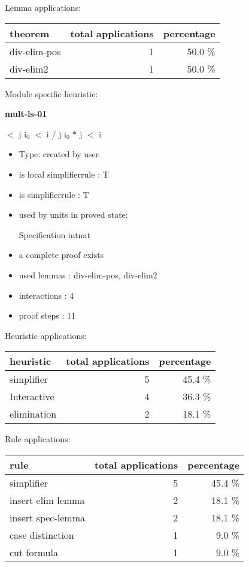 \documentclass[a4paper]{article}
\begin{document}
Lemma applications:

\begin{supertabular}{l|r|r}
theorem	        & total applications & percentage \\ \hline
div-elim-pos & 1 & 50.0 \% \\
div-elim2 & 1 & 50.0 \% \\

\end{supertabular}

Module specific heuristic:

\pagebreak

{\LARGE\bf mult-ls-01}\label{lemma-mult-ls-01}

\medskip

  $<$ j \And $\mbox{i}_{0}$ $<$ i / j \Imp $\mbox{i}_{0}$ $*$ j $<$ i

\begin{itemize}

\item Type: created by user

\item is local simplifierrule : T
\item is simplifierrule : T
\item used by units in proved state:

Specification intnat
\item       a complete proof exists
\item       used lemmas  : div-elim-pos, div-elim2
\item       interactions : 4
\item       proof steps  : 11
\end{itemize}

\medskip


Heuristic applications:

\begin{supertabular}{l|r|r}
heuristic	& total applications & percentage \\ \hline
simplifier & 5 & 45.4 \% \\
Interactive & 4 & 36.3 \% \\
elimination & 2 & 18.1 \% \\

\end{supertabular}

Rule applications:

\begin{supertabular}{l|r|r}
rule	        & total applications & percentage \\ \hline
simplifier & 5 & 45.4 \% \\
insert elim lemma & 2 & 18.1 \% \\
insert spec-lemma & 2 & 18.1 \% \\
case distinction & 1 & 9.0 \% \\
cut formula & 1 & 9.0 \% \\

\end{supertabular}
\end{document}
